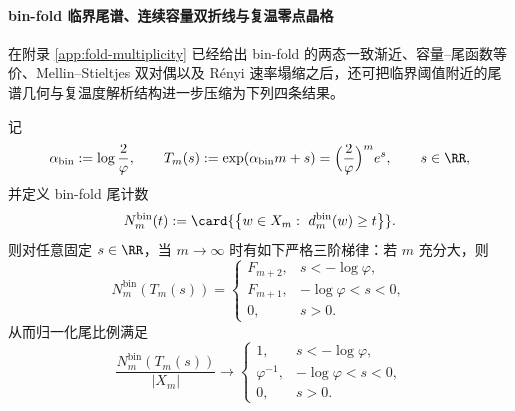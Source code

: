 \paragraph{bin-fold 临界尾谱、连续容量双折线与复温零点晶格}
在附录 \ref{app:fold-multiplicity} 已经给出 bin-fold 的两态一致渐近、容量--尾函数等价、Mellin--Stieltjes 双对偶以及 Rényi 速率塌缩之后，还可把临界阈值附近的尾谱几何与复温度解析结构进一步压缩为下列四条结果。

\begin{theorem}\label{thm:xi-foldbin-critical-tail-three-step-rigidity}
记
\[
\alpha_{\mathrm{bin}}:=\log\frac{2}{\varphi},
\qquad
T_m(s):=\exp(\alpha_{\mathrm{bin}}m+s)=\Bigl(\frac{2}{\varphi}\Bigr)^m e^s,
\qquad s\in\RR,
\]
并定义 bin-fold 尾计数
\[
N_m^{\mathrm{bin}}(t):=\card{\left\{w\in X_m:\ d_m^{\mathrm{bin}}(w)\ge t\right\}}.
\]
则对任意固定 \(s\in\RR\)，当 \(m\to\infty\) 时有如下严格三阶梯律：若 \(m\) 充分大，则
\[
\boxed{
N_m^{\mathrm{bin}}(T_m(s))
=
\begin{cases}
F_{m+2}, & s<-\log\varphi,\\[2mm]
F_{m+1}, & -\log\varphi<s<0,\\[2mm]
0, & s>0.
\end{cases}}
\]
从而归一化尾比例满足
\[
\boxed{
\frac{N_m^{\mathrm{bin}}(T_m(s))}{|X_m|}
\longrightarrow
\begin{cases}
1, & s<-\log\varphi,\\[2mm]
\varphi^{-1}, & -\log\varphi<s<0,\\[2mm]
0, & s>0.
\end{cases}}
\]
\end{theorem}

